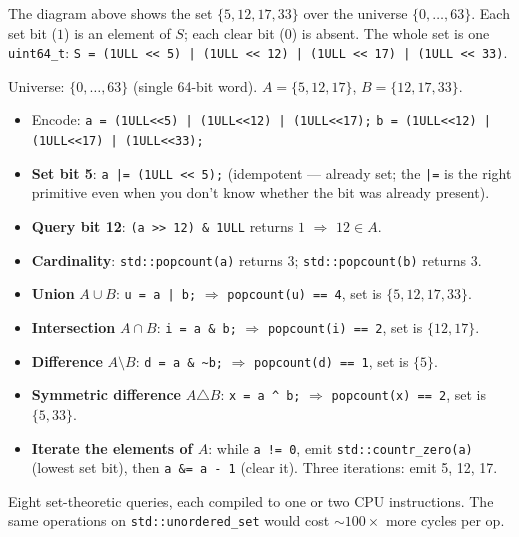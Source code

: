 \documentclass[11pt]{article}
\begin{document}
The diagram above shows the set $\{5, 12, 17, 33\}$ over the
universe $\{0, \ldots, 63\}$. Each set bit ($1$) is an element of
$S$; each clear bit ($0$) is absent. The whole set is one
\texttt{uint64\_t}: \texttt{S = (1ULL << 5) | (1ULL << 12) | (1ULL
<< 17) | (1ULL << 33)}.

\begin{examplebox}
Universe: $\{0, \ldots, 63\}$ (single 64-bit word).
$A = \{5, 12, 17\}$, $B = \{12, 17, 33\}$.

\begin{itemize}[leftmargin=*]
    \item Encode:
          \texttt{a = (1ULL<<5) | (1ULL<<12) | (1ULL<<17);}
          \texttt{b = (1ULL<<12) | (1ULL<<17) | (1ULL<<33);}
    \item \textbf{Set bit 5}: \texttt{a |= (1ULL << 5);}
          (idempotent --- already set; the \texttt{|=} is the
          right primitive even when you don't know whether the
          bit was already present).
    \item \textbf{Query bit 12}:
          \texttt{(a >> 12) \& 1ULL} returns $1$
          $\Rightarrow$ $12 \in A$.
    \item \textbf{Cardinality}:
          \texttt{std::popcount(a)} returns $3$;
          \texttt{std::popcount(b)} returns $3$.
    \item \textbf{Union} $A \cup B$:
          \texttt{u = a | b;}
          $\Rightarrow$ \texttt{popcount(u) == 4},
          set is $\{5, 12, 17, 33\}$.
    \item \textbf{Intersection} $A \cap B$:
          \texttt{i = a \& b;} $\Rightarrow$
          \texttt{popcount(i) == 2}, set is $\{12, 17\}$.
    \item \textbf{Difference} $A \setminus B$:
          \texttt{d = a \& \~{}b;} $\Rightarrow$
          \texttt{popcount(d) == 1}, set is $\{5\}$.
    \item \textbf{Symmetric difference} $A \triangle B$:
          \texttt{x = a \^{} b;} $\Rightarrow$
          \texttt{popcount(x) == 2}, set is $\{5, 33\}$.
    \item \textbf{Iterate the elements of $A$}: while
          \texttt{a != 0}, emit \texttt{std::countr\_zero(a)}
          (lowest set bit), then \texttt{a \&= a - 1} (clear it).
          Three iterations: emit 5, 12, 17.
\end{itemize}

Eight set-theoretic queries, each compiled to one or two CPU
instructions. The same operations on \texttt{std::unordered\_set}
would cost $\sim 100\times$ more cycles per op.
\end{examplebox}
\end{document}
